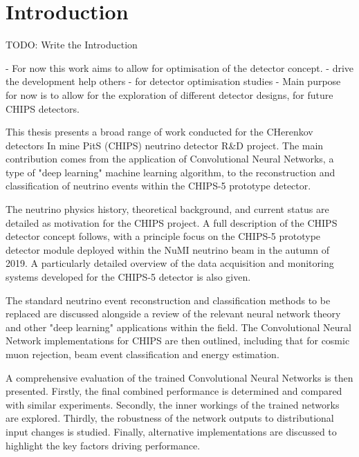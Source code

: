 \chapter{Introduction} %
\label{chap:introduction} %
\setcounter{page}{17}  %

TODO: Write the Introduction

- For now this work aims to allow for optimisation of the \chips detector concept.
- drive the development help others
- for detector optimisation studies
- Main purpose for now is to allow for the exploration of different detector designs, for future
CHIPS detectors.

This thesis presents a broad range of work conducted for the CHerenkov detectors In mine PitS
(CHIPS) neutrino detector R&D project. The main contribution comes from the application of
Convolutional Neural Networks, a type of "deep learning" machine learning algorithm, to the
reconstruction and classification of neutrino events within the CHIPS-5 prototype detector.

The neutrino physics history, theoretical background, and current status are detailed as
motivation for the CHIPS project. A full description of the CHIPS detector concept follows, with a
principle focus on the CHIPS-5 prototype detector module deployed within the NuMI neutrino beam in
the autumn of 2019. A particularly detailed overview of the data acquisition and monitoring
systems developed for the CHIPS-5 detector is also given.

The standard neutrino event reconstruction and classification methods to be replaced are discussed
alongside a review of the relevant neural network theory and other "deep learning" applications
within the field. The Convolutional Neural Network implementations for CHIPS are then outlined,
including that for cosmic muon rejection, beam event classification and energy estimation.

A comprehensive evaluation of the trained Convolutional Neural Networks is then presented.
Firstly, the final combined performance is determined and compared with similar experiments.
Secondly, the inner workings of the trained networks are explored. Thirdly, the robustness of the
network outputs to distributional input changes is studied. Finally, alternative implementations
are discussed to highlight the key factors driving performance.


